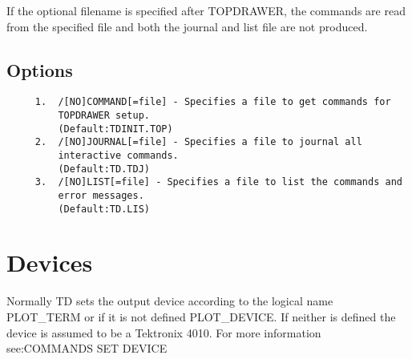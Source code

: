 If the optional filename is specified after TOPDRAWER, the commands are
read from the specified file and both the journal and list file are not
produced.  
\subsection{Options}
\begin{verbatim}
     1.  /[NO]COMMAND[=file] - Specifies a file to get commands for
         TOPDRAWER setup.  
         (Default:TDINIT.TOP) 
     2.  /[NO]JOURNAL[=file] - Specifies a file to journal all
         interactive commands.  
         (Default:TD.TDJ) 
     3.  /[NO]LIST[=file] - Specifies a file to list the commands and
         error messages.  
         (Default:TD.LIS) 
\end{verbatim}
\section{Devices}
Normally TD sets the output device according to the logical name PLOT\_TERM
or if it is not defined PLOT\_DEVICE.  If neither is defined the device is
assumed to be a Tektronix 4010.  
For more information see:COMMANDS SET DEVICE 
